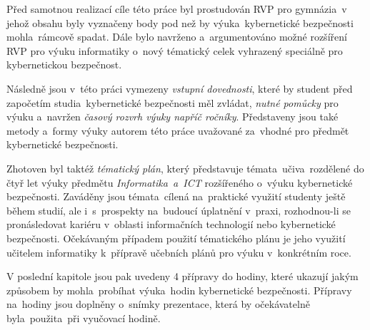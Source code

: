 \documentclass[a4paper, 12pt]{article}
\begin{document}
Před samotnou realizací cíle této práce byl prostudován RVP pro gymnázia~v jehož obsahu byly vyznačeny body pod než by výuka~kybernetické bezpečnosti mohla~rámcově spadat. Dále bylo navrženo a~argumentováno možné rozšíření RVP pro výuku informatiky o~nový tématický celek vyhrazený speciálně pro kybernetickou bezpečnost.

Následně jsou v~této práci vymezeny \textit{vstupní dovednosti}, které by student před započetím studia~kybernetické bezpečnosti měl zvládat, \textit{nutné pomůcky} pro výuku a~navržen \textit{časový rozvrh výuky napříč ročníky}. Představeny jsou také metody a~formy výuky autorem této práce uvažované za~vhodné pro předmět kybernetické bezpečnosti.

Zhotoven byl taktéž \textit{tématický plán}, který představuje témata~učiva~rozdělené do čtyř let výuky předmětu \textit{Informatika~a~ICT} rozšířeného o~výuku kybernetické bezpečnosti. Zaváděny jsou témata~cílená na~praktické využití studenty ještě během studií, ale i~s~prospekty na~budoucí úplatnění v~praxi, rozhodnou-li se pronásledovat kariéru v~oblasti informačních technologií nebo kybernetické bezpečnosti. Očekávaným případem použití tématického plánu je jeho využití učitelem informatiky k~přípravě učebních plánů pro výuku v~konkrétním roce.

V poslední kapitole jsou pak uvedeny 4 přípravy do hodiny, které ukazují jakým způsobem by mohla~probíhat výuka~hodin kybernetické bezpečnosti. Přípravy na~hodiny jsou doplněny o~snímky prezentace, která by očekávatelně byla~použita~při vyučovací hodině.
\end{document}

